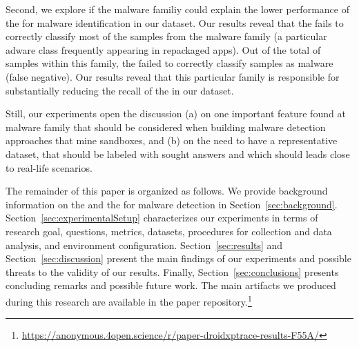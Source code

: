 Second, we explore if the
malware familiy could explain the lower performance of the \mas for malware identification in 
our dataset. Our results reveal that the \mas fails to correctly classify most of the samples from
the \gps malware family (a particular adware class frequently appearing in repackaged apps).
Out of the total of \appsGps samples within this family, the \mas failed to correctly classify \appsGpsFN samples as malware (false negative).
Our results reveal that this particular family is responsible for substantially reducing the recall of the \mas in our dataset.
  

%
Still, 
our experiments open the discussion (a) on one important feature found at \gps malware family that should be considered when building malware detection approaches that mine sandboxes, and (b) on the need to have a representative dataset, that should be labeled with sought answers and which should leads close to real-life scenarios.


The remainder of this paper is organized as follows. 
We provide background information on the \mas and the \mas for malware detection in
Section~\ref{sec:background}. Section~\ref{sec:experimentalSetup}
characterizes our experiments in terms of research goal, questions, metrics, datasets, procedures for collection and data analysis, and environment configuration. Section~\ref{sec:results} and Section~\ref{sec:discussion} present the main findings of our experiments and possible threats to the validity of our results. Finally,
Section~\ref{sec:conclusions} presents concluding remarks and possible future
work. The main artifacts we produced during this research are available in the
paper repository.\footnote{\url{https://anonymous.4open.science/r/paper-droidxptrace-results-F55A/}}
